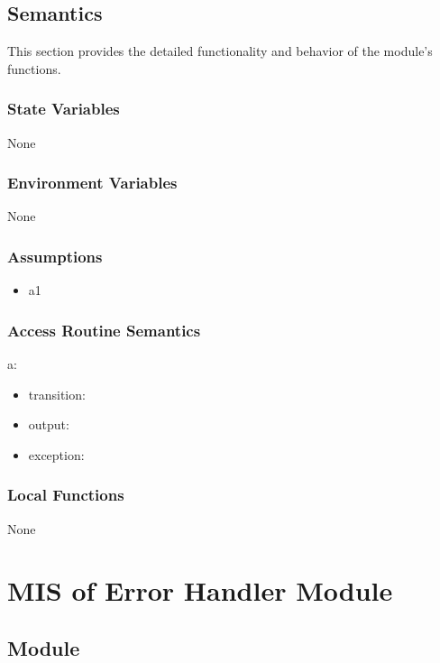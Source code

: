\documentclass[12pt, titlepage]{article}
\begin{document}
\subsection{Semantics}

This section provides the detailed functionality and behavior of the module’s
functions.

\subsubsection{State Variables}

None

\subsubsection{Environment Variables}

None

\subsubsection{Assumptions}

\begin{itemize}
\item a1
\end{itemize}

\subsubsection{Access Routine Semantics}

\noindent a:
\begin{itemize}
\item transition: 
\item output: 
\item exception: 
\end{itemize}

\subsubsection{Local Functions}

None

\newpage

\section{MIS of Error Handler Module} \label{MIS_ERROR}

\subsection{Module}
\end{document}
